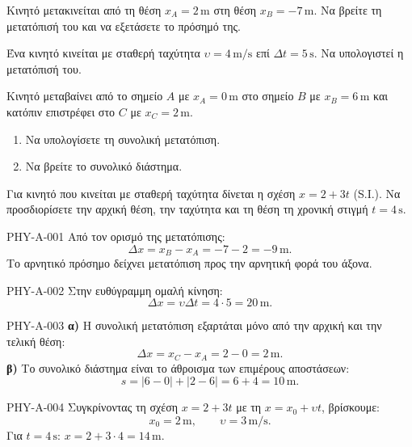 \begin{enumerate}[leftmargin=6mm]
\end{enumerate}
\begin{exercise}[PHY-A-001]{}
Κινητό μετακινείται από τη θέση \(x_A=2\,\mathrm{m}\) στη θέση \(x_B=-7\,\mathrm{m}\). Να βρείτε τη μετατόπισή του και να εξετάσετε το πρόσημό της.
\end{exercise}
\begin{exercise}[PHY-A-002]{}
Ένα κινητό κινείται με σταθερή ταχύτητα \(\upsilon=4\,\mathrm{m/s}\) επί \(\Delta t=5\,\mathrm{s}\). Να υπολογιστεί η μετατόπισή του.
\end{exercise}
\begin{exercise}[PHY-A-003]{}
Κινητό μεταβαίνει από το σημείο \(A\) με \(x_A=0\,\mathrm{m}\) στο σημείο \(B\) με \(x_B=6\,\mathrm{m}\) και κατόπιν επιστρέφει στο \(C\) με \(x_C=2\,\mathrm{m}\).
\begin{enumerate}[label=\BookGreek*)]
\item Να υπολογίσετε τη συνολική μετατόπιση.
\item Να βρείτε το συνολικό διάστημα.
\end{enumerate}
\end{exercise}
\begin{exercise}[PHY-A-004]{}
Για κινητό που κινείται με σταθερή ταχύτητα δίνεται η σχέση \(x=2+3t\) (S.I.). Να προσδιορίσετε την αρχική θέση, την ταχύτητα και τη θέση τη χρονική στιγμή \(t=4\,\mathrm{s}\).
\end{exercise}
\clearpage
{}
\begin{booksolution}{PHY-A-001}
Από τον ορισμό της μετατόπισης:
\[\Delta x=x_B-x_A=-7-2=-9\,\mathrm{m}.\]
Το αρνητικό πρόσημο δείχνει μετατόπιση προς την αρνητική φορά του άξονα.
\end{booksolution}
\begin{booksolution}{PHY-A-002}
Στην ευθύγραμμη ομαλή κίνηση:
\[\Delta x=\upsilon\Delta t=4\cdot5=20\,\mathrm{m}.\]
\end{booksolution}
\begin{booksolution}{PHY-A-003}
\textbf{α)} Η συνολική μετατόπιση εξαρτάται μόνο από την αρχική και την τελική θέση:
\[\Delta x=x_C-x_A=2-0=2\,\mathrm{m}.\]
\textbf{β)} Το συνολικό διάστημα είναι το άθροισμα των επιμέρους αποστάσεων:
\[s=|6-0|+|2-6|=6+4=10\,\mathrm{m}.\]
\end{booksolution}
\begin{booksolution}{PHY-A-004}
Συγκρίνοντας τη σχέση \(x=2+3t\) με τη \(x=x_0+\upsilon t\), βρίσκουμε:
\[x_0=2\,\mathrm{m},\qquad\upsilon=3\,\mathrm{m/s}.\]
Για \(t=4\,\mathrm{s}\): \(x=2+3\cdot 4=14\,\mathrm{m}\).
\end{booksolution}
